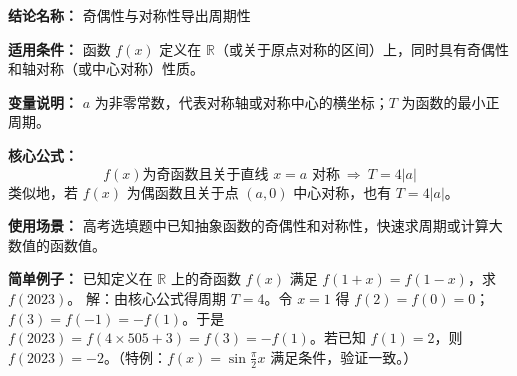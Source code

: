 \textbf{结论名称：} 奇偶性与对称性导出周期性

\textbf{适用条件：} 函数 \(f(x)\) 定义在 \(\mathbb{R}\)（或关于原点对称的区间）上，同时具有奇偶性和轴对称（或中心对称）性质。

\textbf{变量说明：} \(a\) 为非零常数，代表对称轴或对称中心的横坐标；\(T\) 为函数的最小正周期。

\textbf{核心公式：}
\[
\boxed{f(x)\text{为奇函数且关于直线 }x=a\text{ 对称} \ \Longrightarrow\ T=4|a|}
\]
类似地，若 \(f(x)\) 为偶函数且关于点 \((a,0)\) 中心对称，也有 \(T=4|a|\)。

\textbf{使用场景：} 高考选填题中已知抽象函数的奇偶性和对称性，快速求周期或计算大数值的函数值。

\textbf{简单例子：} 已知定义在 \(\mathbb{R}\) 上的奇函数 \(f(x)\) 满足 \(f(1+x)=f(1-x)\)，求 \(f(2023)\)。
解：由核心公式得周期 \(T=4\)。令 \(x=1\) 得 \(f(2)=f(0)=0\)；\(f(3)=f(-1)=-f(1)\)。于是 \(f(2023)=f(4\times505+3)=f(3)=-f(1)\)。若已知 \(f(1)=2\)，则 \(f(2023)=-2\)。（特例：\(f(x)=\sin\frac{\pi}{2}x\) 满足条件，验证一致。）